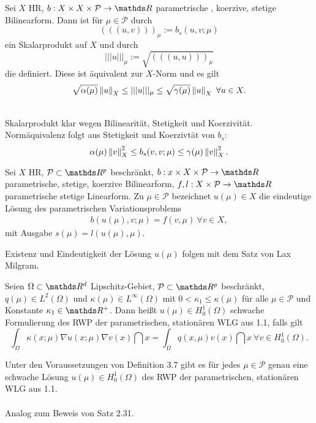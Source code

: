 Sei $X$ HR, $b:X\times X\times \mathcal{P}\to \R$ parametrische , koerzive, stetige Bilinearform.
Dann ist für $\mu\in\mathcal{P}$ durch
\[
(((u,v)))_\mu := b_s(u,v;\mu)
\]
ein Skalarprodukt auf $X$ und durch
\[
|||u|||_\mu := \sqrt{(((u,u)))_\mu}
\]
die  definiert.
Diese ist äquivalent zur $X$-Norm und es gilt
\[
\sqrt{\alpha(\mu)}\left\Vert u\right\Vert_X \le |||u|||_\mu \le \sqrt{\gamma(\mu)}\left\Vert u\right\Vert_X ~\forall u\in X.
\]

\\
Skalarprodukt klar wegen Bilinearität, Stetigkeit und Koerzivität.
Normäquivalenz folgt aus Stetigkeit und Koerzivtät von $b_s$:
\[
\alpha(\mu)\left\Vert v\right\Vert_X^2\le b_s(v,v;\mu) \le \gamma(\mu) \left\Vert v\right\Vert_X^2.
\]

Sei $X$ HR, $\mathcal{P}\subset \R^p$ beschränkt, $b: x\times X\times \mathcal{P}\to \R$ parametrische, stetige, koerzive Bilinearform, $f,l:X\times \mathcal{P}\to \R$ parametrische stetige Linearform.
Zu $\mu \in\mathcal{P}$ bezeichnet $u(\mu)\in X$ die eindeutige Lösung des parametrischen Variationsproblems
\begin{align}
b(u(\mu),v;\mu) = f(v,\mu) ~\forall v\in X,
\end{align}
mit Ausgabe $s(\mu)=l(u(\mu),\mu)$.

Existenz und Eindeutigkeit der Lösung $u(\mu)$ folgen mit dem Satz von Lax Milgram.

Seien $\Omega\subset\R^d$ Lipschitz-Gebiet, $\mathcal{P}\subset \R^p$ beschränkt, $q(\mu)\in L^2(\Omega)$ und $\kappa(\mu)\in L^\infty(\Omega)$ mit $0<\kappa_1\le \kappa(\mu)$ für alle $\mu\in\mathcal{P}$ und Konstante $\kappa_1\in \R^+$.
Dann heißt $u(\mu)\in H_0^{1}(\Omega)$ schwache Formulierung des RWP der parametrischen, stationären WLG aus 1.1, falls gilt
\[
\int_{\Omega} \kappa(x;\mu)\nabla u(x;\mu) \nabla v(x)\dint x = \int_{\Omega} q(x,\mu)v(x)\dint x~\forall v\in H_0^1(\Omega).
\]

Unter den Voraussetzungen von Definition 3.7 gibt es für jedes $\mu\in\mathcal{P}$ genau eine schwache Lösung $u(\mu)\in H_0^1(\Omega)$ des RWP der parametrischen, stationären WLG aus 1.1.\\

\\
Analog zum Beweis von Satz 2.31.

